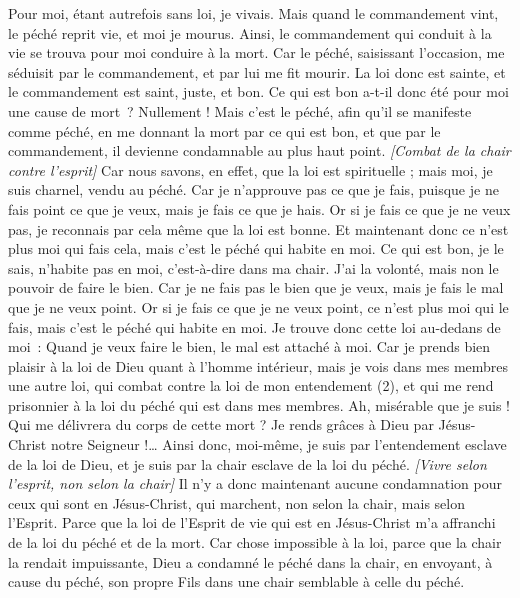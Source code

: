 \begin{multicols}{2}
Pour moi, étant autrefois sans loi, je vivais. Mais quand le commandement vint, le péché reprit vie, et moi je mourus.
Ainsi, le commandement qui conduit à la vie se trouva pour moi conduire à la mort.
Car le péché, saisissant l’occasion, me séduisit par le commandement, et par lui me fit mourir.
La loi donc est sainte, et le commandement est saint, juste, et bon.
Ce qui est bon a-t-il donc été pour moi une cause de mort ? Nullement ! Mais c’est le péché, afin qu'il se manifeste comme péché, en me donnant la mort par ce qui est bon, et que par le commandement, il devienne condamnable au plus haut point.
\textit{[Combat de la chair contre l'esprit]}
Car nous savons, en effet, que la loi est spirituelle ; mais moi, je suis charnel, vendu au péché.
Car je n'approuve pas ce que je fais, puisque je ne fais point ce que je veux, mais je fais ce que je hais.
Or si je fais ce que je ne veux pas, je reconnais par cela même que la loi est bonne.
Et maintenant donc ce n'est plus moi qui fais cela, mais c'est le péché qui habite en moi.
Ce qui est bon, je le sais, n’habite pas en moi, c’est-à-dire dans ma chair. J’ai la volonté, mais non le pouvoir de faire le bien.
Car je ne fais pas le bien que je veux, mais je fais le mal que je ne veux point.
Or si je fais ce que je ne veux point, ce n'est plus moi qui le fais, mais c'est le péché qui habite en moi.
Je trouve donc cette loi au-dedans de moi : Quand je veux faire le bien, le mal est attaché à moi.
Car je prends bien plaisir à la loi de Dieu quant à l'homme intérieur,
mais je vois dans mes membres une autre loi, qui combat contre la loi de mon entendement (2), et qui me rend prisonnier à la loi du péché qui est dans mes membres.
Ah, misérable que je suis ! Qui me délivrera du corps de cette mort ?
Je rends grâces à Dieu par Jésus-Christ notre Seigneur !… Ainsi donc, moi-même, je suis par l’entendement esclave de la loi de Dieu, et je suis par la chair esclave de la loi du péché.
\textit{[Vivre selon l'esprit, non selon la chair]}
\VerseOne{}Il n'y a donc maintenant aucune condamnation pour ceux qui sont en Jésus-Christ, qui marchent, non selon la chair, mais selon l'Esprit.
Parce que la loi de l'Esprit de vie qui est en Jésus-Christ m'a affranchi de la loi du péché et de la mort.
Car chose impossible à la loi, parce que la chair la rendait impuissante, Dieu a condamné le péché dans la chair, en envoyant, à cause du péché, son propre Fils dans une chair semblable à celle du péché.

\end{multicols}
